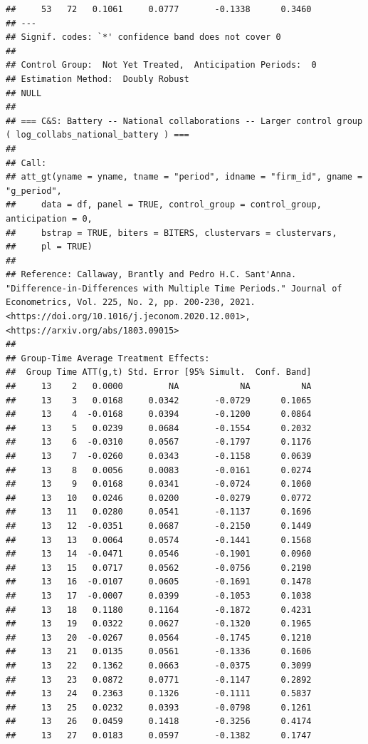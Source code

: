 \documentclass[
]{article}
\begin{document}
\begin{verbatim}
##     53   72   0.1061     0.0777       -0.1338      0.3460  
## ---
## Signif. codes: `*' confidence band does not cover 0
## 
## Control Group:  Not Yet Treated,  Anticipation Periods:  0
## Estimation Method:  Doubly Robust
## NULL
## 
## === C&S: Battery -- National collaborations -- Larger control group ( log_collabs_national_battery ) ===
## 
## Call:
## att_gt(yname = yname, tname = "period", idname = "firm_id", gname = "g_period", 
##     data = df, panel = TRUE, control_group = control_group, anticipation = 0, 
##     bstrap = TRUE, biters = BITERS, clustervars = clustervars, 
##     pl = TRUE)
## 
## Reference: Callaway, Brantly and Pedro H.C. Sant'Anna.  "Difference-in-Differences with Multiple Time Periods." Journal of Econometrics, Vol. 225, No. 2, pp. 200-230, 2021. <https://doi.org/10.1016/j.jeconom.2020.12.001>, <https://arxiv.org/abs/1803.09015> 
## 
## Group-Time Average Treatment Effects:
##  Group Time ATT(g,t) Std. Error [95% Simult.  Conf. Band]  
##     13    2   0.0000         NA            NA          NA  
##     13    3   0.0168     0.0342       -0.0729      0.1065  
##     13    4  -0.0168     0.0394       -0.1200      0.0864  
##     13    5   0.0239     0.0684       -0.1554      0.2032  
##     13    6  -0.0310     0.0567       -0.1797      0.1176  
##     13    7  -0.0260     0.0343       -0.1158      0.0639  
##     13    8   0.0056     0.0083       -0.0161      0.0274  
##     13    9   0.0168     0.0341       -0.0724      0.1060  
##     13   10   0.0246     0.0200       -0.0279      0.0772  
##     13   11   0.0280     0.0541       -0.1137      0.1696  
##     13   12  -0.0351     0.0687       -0.2150      0.1449  
##     13   13   0.0064     0.0574       -0.1441      0.1568  
##     13   14  -0.0471     0.0546       -0.1901      0.0960  
##     13   15   0.0717     0.0562       -0.0756      0.2190  
##     13   16  -0.0107     0.0605       -0.1691      0.1478  
##     13   17  -0.0007     0.0399       -0.1053      0.1038  
##     13   18   0.1180     0.1164       -0.1872      0.4231  
##     13   19   0.0322     0.0627       -0.1320      0.1965  
##     13   20  -0.0267     0.0564       -0.1745      0.1210  
##     13   21   0.0135     0.0561       -0.1336      0.1606  
##     13   22   0.1362     0.0663       -0.0375      0.3099  
##     13   23   0.0872     0.0771       -0.1147      0.2892  
##     13   24   0.2363     0.1326       -0.1111      0.5837  
##     13   25   0.0232     0.0393       -0.0798      0.1261  
##     13   26   0.0459     0.1418       -0.3256      0.4174  
##     13   27   0.0183     0.0597       -0.1382      0.1747  

\end{verbatim}
\end{document}
